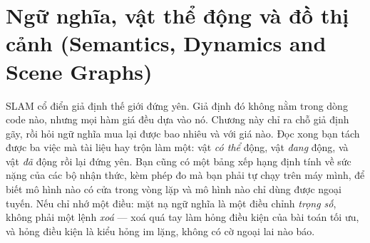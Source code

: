 \documentclass[../../deep_learning.tex]{subfiles}
\begin{document}
\chapter{Ngữ nghĩa, vật thể động và đồ thị cảnh (Semantics, Dynamics and Scene Graphs)}

\begin{tomtat}
SLAM cổ điển giả định thế giới đứng yên. Giả định đó không nằm trong dòng code nào, nhưng mọi hàm giá đều dựa vào nó. Chương này chỉ ra chỗ giả định gãy, rồi hỏi ngữ nghĩa mua lại được bao nhiêu và với giá nào. Đọc xong bạn tách được ba việc mà tài liệu hay trộn làm một: vật \emph{có thể} động, vật \emph{đang} động, và vật \emph{đã} động rồi lại đứng yên. Bạn cũng có một bảng xếp hạng định tính về sức nặng của các bộ nhận thức, kèm phép đo mà bạn phải tự chạy trên máy mình, để biết mô hình nào có cửa trong vòng lặp và mô hình nào chỉ dùng được ngoại tuyến. Nếu chỉ nhớ một điều: mặt nạ ngữ nghĩa là một điều chỉnh \emph{trọng số}, không phải một lệnh \emph{xoá} --- xoá quá tay làm hỏng điều kiện của bài toán tối ưu, và hỏng điều kiện là kiểu hỏng im lặng, không có cờ ngoại lai nào báo.
\end{tomtat}
\end{document}
